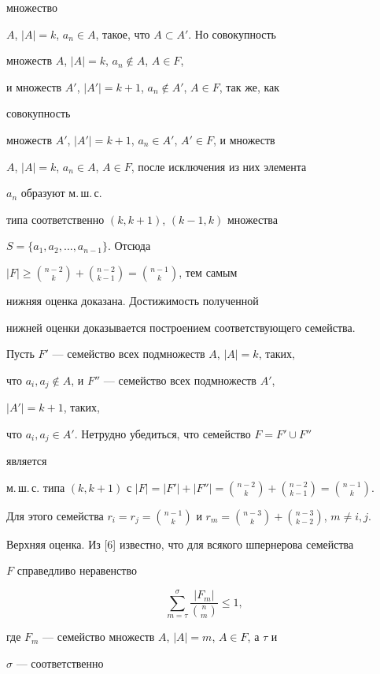 множество 


$A$, $|A|=k$, $a_n\in A$, такое, что $A\subset A'$. Но совокупность 


множеств $A$, $|A|=k$, $a_n\notin A$, $A\in F$,


и множеств $A'$, $|A'|=k+1$, $a_n\notin A'$, $A\in F$, так же, как 


совокупность 


множеств $A'$, $|A'|=k+1$, $a_n\in A'$, $A'\in F$, и множеств 


$A$, $|A|=k$, $a_n\in A$, $A\in F$, после исключения из них элемента 


$a_n$ образуют м.\,ш.\,с. 


типа соответственно $(k,k+1)$, $(k-1,k)$ множества 


$S=\{a_1,a_2,\dotsc,a_{n-1}\}$. Отсюда 


$|F|\ge \binom{n-2}{k}+ \binom{n-2}{k-1}= \binom{n-1}{k}$, тем самым 


нижняя оценка доказана. Достижимость полученной 


нижней оценки доказывается построением соответствующего семейства. 


Пусть $F'$ --- семейство всех подмножеств $A$, $|A|=k$, таких, 


что $a_i,a_j\notin A$, и $F''$ --- семейство всех подмножеств $A'$, 


$|A'|=k+1$, таких, 


что $a_i,a_j\in A'$. Нетрудно убедиться, что семейство $F=F'\cup F''$ 


является 


м.\,ш.\,с. типа $(k,k+1)$ с $|F|=|F'|+|F''|= \binom{n-2}{k}+ 


\binom{n-2}{k-1}=\binom{n-1}{k}$. 


Для этого семейства $r_i=r_j=\binom{n-1}{k}$ и $r_m= \binom{n-3}{k}+ 


\binom{n-3}{k-2}$, $m\ne i,j$. 


 


Верхняя оценка. Из [6] известно, что для всякого шпернерова семейства 


$F$ справедливо неравенство 


$$ 


\sum^\sigma_{m=\tau}\frac{|F_m|}{\binom{n}{m}}\le1, 


$$ 


где $F_m$ --- семейство множеств $A$, $|A|=m$, $A\in F$, а $\tau$ и 


$\sigma$ --- соответственно 


